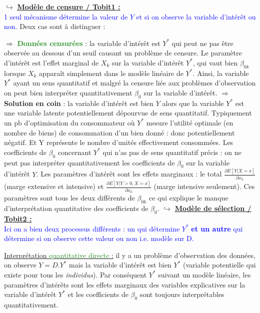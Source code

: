 \bigbreak
\noindent $\hookrightarrow$ \underline{\textbf{Modèle de censure / Tobit1 :}} \\
\textcolor{blue}{1 seul mécanisme détermine la valeur de $Y$ et si on observe la variable d'intérêt ou non. } Deux cas sont à distinguer :\par
\bigbreak
$\Rightarrow$ \textbf{\textcolor{ForestGreen}{Données censurées}} : la variable d'intérêt est $Y^{*}$ qui peut ne pas être observée au dessous d'un seuil causant un problème de censure. Le paramètre d'intérêt est l'effet marginal de $X_{k}$ sur la variable d'intérêt $Y^{*}$, qui vaut bien $\beta_{0k}$ lorsque $X_{k}$ apparaît simplement dans le modèle linéaire de $Y^{*}$. Ainsi, la variable $Y^{*}$ ayant un sens quantitatif et malgré la censure liée aux problèmes d'observation on peut bien interpréter quantitativement $\beta_{0}$ sur la variable d'intérêt.
\bigbreak
$\Rightarrow$ \textbf{\textcolor{BrickRed}{Solution en coin}} : la variable d'intérêt est bien $Y$ alors que la variable $Y^{*}$ est une variable latente potentiellement dépourvue de sens quantitatif. Typiquement un pb d'optimisation du consommateur où $Y^{*}$ mesure l'utilité optimale (en nombre de biens) de consommation d'un bien donné : donc potentiellement négatif. Et Y représente le nombre d'unités effectivement consommées. Les coefficients de $\beta_{0}$ concernant $Y^{*}$ qui n'as pas de sens quantitatif précis : on ne peut pas interpréter quantitativement les coefficients de $\beta_{0}$ sur la variable d'intérêt $Y$. Les paramètres d'intérêt sont les effets marginaux : le total $\frac{\partial E[Y|X=x]}{\partial x_{k}}$ (marge extensive et intensive) et $\frac{\partial E[Y|Y>0,X=x]}{\partial x_{k}}$ (marge intensive seulement). Ces paramètres sont tous les deux différents de $\beta_{0k}$ ce qui explique le manque d'interprétation quantitative des coefficients de $\beta_{0}$.
\bigbreak
\noindent $\hookrightarrow$ \underline{\textbf{Modèle de sélection / Tobit2 :}} \\
\textcolor{blue}{Ici on a bien deux processus différents : un qui détermine $Y^{*}$ \textbf{et un autre} qui détermine si on observe cette valeur ou non i.e. modèle sur D.}\par 
\underline{Interprétation \textcolor{ForestGreen}{quantitative directe} :} il y a un problème d'observation des données, on observe $Y=D.Y^{*}$ mais la variable d'intérêt est bien $Y^{*}$ (variable potentielle qui existe pour tous les \textit{individus}). Par conséquent $Y^{*}$ suivant un modèle linéaire, les paramètres d'intérêts sont les effets marginaux des variables explicatives sur la variable d'intérêt $Y^{*}$ et les coefficients de $\beta_{0}$ sont toujours interprétables quantitativement.

\newpage